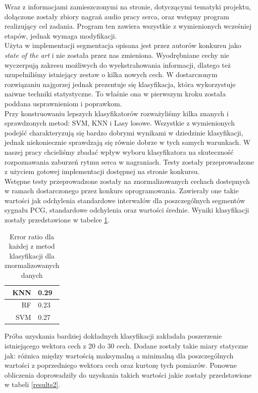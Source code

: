 \documentclass[a4paper]{report}
\begin{document}
Wraz z informacjami zamieszczonymi na stronie, dotyczącymi tematyki projektu, dołączone zostały zbiory nagrań audio pracy serca, oraz wstępny program realizujący cel zadania. Program ten zawiera wszystkie z wymienionych wcześniej etapów, jednak wymaga modyfikacji. \\
Użyta w implementacji segmentacja opisana jest przez autorów konkursu jako \textit{state of the art} i nie została przez nas zmieniona. Wyodrębniane cechy nie wyczerpują zakresu możliwych do wyekstrahowania informacji, dlatego też uzupełniliśmy istniejący zestaw o kilka nowych cech. W dostarczonym rozwiązaniu najgorzej jednak prezentuje się klasyfikacja, która wykorzystuje naiwne techniki statystyczne. To właśnie ona w pierwszym kroku została poddana usprawnieniom i poprawkom.\\

Przy konstruowaniu lepszych klasyfikatorów rozważyliśmy kilka znanych i sprawdzonych metod: SVM, KNN i Lasy losowe. Wszystkie z wymienionych podejść charakteryzują się bardzo dobrymi wynikami w dziedzinie klasyfikacji, jednak niekoniecznie sprawdzają się równie dobrze w tych samych warunkach. W naszej pracy chcieliśmy zbadać wpływ wyboru klasyfikatora na skuteczność rozpoznawania zaburzeń rytmu serca w nagraniach. Testy zostały przeprowadzone z użyciem gotowej implementacji dostępnej na stronie konkursu.\\

Wstępne testy przeprowadzone zostały na znormalizowanych cechach dostepnych w ramach dostarczonego przez konkurs oprogramowania. Zawierały one takie wartości jak odchylenia standardowe interwałów dla poszczególnych segmentów sygnału PCG, standardowe odchylenia oraz wartości średnie. Wyniki klasyfikacji zostały przedstawione w tabelce \ref{results1}. \\

\begin{table}[!htp]
    \centering
    \begin{tabular}{|r|l|}
      \hline 
      KNN & 0.29 \\
      \hline
      RF & 0.23 \\
      \hline
      SVM & 0.27 \\
      \hline
    \end{tabular} 
    
    \caption{Error ratio dla każdej z metod klasyfikacji dla znormalizowanych danych}
    \label{results1}
\end{table}

Próba uzyskania bardziej dokładnych klasyfikacji zakładała poszerzenie istniejącego wektora cech z 20 do 30 cech. Dodane zostały takie miary statyczne jak: różnica między wartością maksymalną a minimalną dla poszczególnych wartości z poprzedniego wektora cech oraz kurtozę tych pomiarów. Ponowne obliczenia doprowadziły do uzyskania takich wartości jakie zostały przedstawione w tabeli \ref{results2}.
\end{document}
